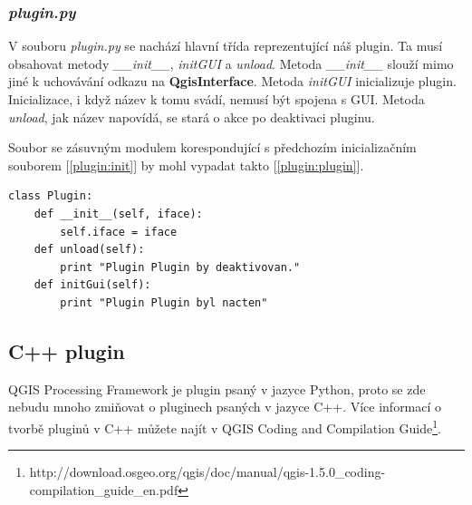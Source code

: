 \subsubsection*{\textit{plugin.py}}
V souboru \textit{plugin.py} se nachází hlavní třída reprezentující náš plugin. Ta musí obsahovat metody \textit{\_\_init\_\_}, \textit{initGUI} a \textit{unload}. Metoda \textit{\_\_init\_\_} slouží mimo jiné k uchovávání odkazu na \textbf{QgisInterface}. Metoda \textit{initGUI} inicializuje plugin. Inicializace, i když název k tomu svádí, nemusí být spojena s GUI. Metoda \textit{unload}, jak název napovídá, se stará o akce po deaktivaci pluginu. 

\newpage
Soubor se zásuvným modulem korespondující s předchozím inicializačním souborem [\autoref{plugin:init}] by mohl vypadat takto [\autoref{plugin:plugin}]. \\

\begin{lstlisting}[caption={plugin.py - plugin},label=plugin:plugin]
class Plugin:
    def __init__(self, iface):
        self.iface = iface
    def unload(self):
        print "Plugin Plugin by deaktivovan."
    def initGui(self):
		print "Plugin Plugin byl nacten"
\end{lstlisting}

\subsection{C++ plugin}
QGIS Processing Framework je plugin psaný v jazyce Python, proto se zde nebudu mnoho zmiňovat o pluginech psaných v jazyce C++. Více informací o tvorbě pluginů v C++ můžete najít v QGIS Coding and Compilation Guide\footnote{http://download.osgeo.org/qgis/doc/manual/qgis-1.5.0\_coding-compilation\_guide\_en.pdf}.
% 



